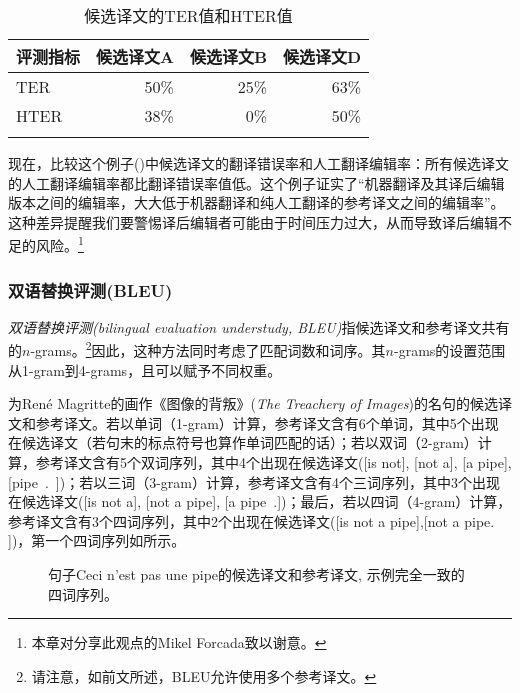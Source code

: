 \documentclass[output=paper]{langscibook}
\begin{document}
\begin{table}
\begin{tabular}{lrrr}
\lsptoprule
{评测指标} & \multicolumn{1}{c}{候选译文A} & \multicolumn{1}{c}{候选译文B} & \multicolumn{1}{c}{候选译文D}\\
\midrule
TER & 50\% & 25\% & 63\%\\
HTER & 38\% & 0\% & 50\%\\
\lspbottomrule
\end{tabular}
\caption{\label{bkm:Ref69688808}\label{tab:rossi:11}候选译文的TER值和HTER值}
\end{table}

现在，比较这个例子()中候选译文的翻译错误率和人工翻译编辑率：所有候选译文的人工翻译编辑率都比翻译错误率值低。这个例子证实了“机器翻译及其译后编辑版本之间的编辑率，大大低于机器翻译和纯人工翻译的参考译文之间的编辑率”\citep[52]{Koehn2020}。这种差异提醒我们要警惕译后编辑者可能由于时间压力过大，从而导致译后编辑不足的风险。\footnote{本章对分享此观点的Mikel Forcada致以谢意。}

 
\subsubsection{\label{bkm:Ref57827797}双语替换评测(BLEU)}
\textit{双语替换评测(bilingual evaluation understudy, BLEU)}指候选译文和参考译文共有的$n$-grams。\footnote{请注意，如前文所述，BLEU允许使用多个参考译文。}因此，这种方法同时考虑了匹配词数和词序。其$n$-grams的设置范围从1-gram到4-grams，且可以赋予不同权重。

为René Magritte的画作《图像的背叛》(\textit{The Treachery of Images})的名句的候选译文和参考译文。若以单词（1-gram）计算，参考译文含有6个单词，其中5个出现在候选译文（若句末的标点符号也算作单词匹配的话）；若以双词（2-gram）计算，参考译文含有5个双词序列，其中4个出现在候选译文([is not], [not a], [a pipe], [pipe~.~])；若以三词（3-gram）计算，参考译文含有4个三词序列，其中3个出现在候选译文([is not a], [not a pipe], [a pipe~.])；最后，若以四词（4-gram）计算，参考译文含有3个四词序列，其中2个出现在候选译文([is not a pipe],[not a pipe. ])，第一个四词序列如所示。


\begin{figure}
\caption{句子\textup{Ceci n’est pas une pipe}的候选译文和参考译文, 示例完全一致的四词序列。}
\label{fig:rossi:9}
\end{figure}
\end{document}
